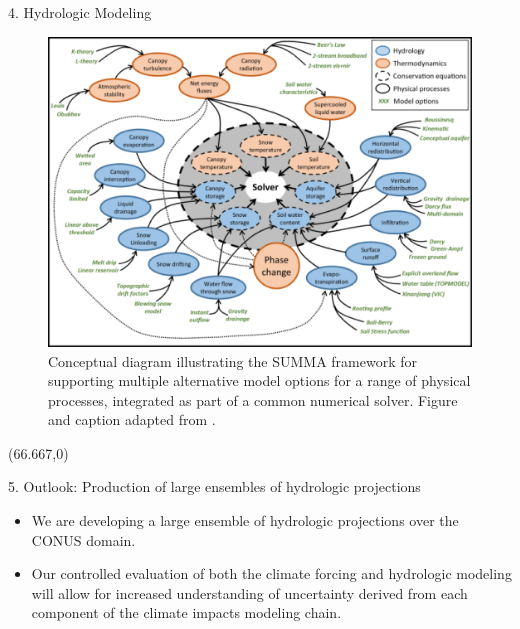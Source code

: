 \documentclass{beamer}
\begin{document}
\begin{frame}{}
\begin{columns}
\begin{column}{.3333\paperwidth}
\begin{textblock}{\textwidth \TPHorizModule}
\begin{block}{4. Hydrologic Modeling}
     \begin{figure}
      \center\includegraphics[width=0.6\linewidth]{figures/summa.png}
      \caption{Conceptual diagram illustrating the SUMMA framework for supporting multiple alternative model options for a range of physical processes, integrated as part of a common numerical solver. Figure and caption adapted from \citet{Clark_2015}.}
      \label{fig:summa}
     \end{figure}

    \end{block}
   \end{textblock}



   \begin{textblock}{\textwidth \TPHorizModule}(66.667,0)
    \begin{block}{5. Outlook: Production of large ensembles of hydrologic projections}

     \begin{itemize}
      \justifying
      \item We are developing a large ensemble of hydrologic projections over the CONUS domain.
      \item Our controlled evaluation of both the climate forcing and hydrologic modeling will allow for increased understanding of uncertainty derived from each component of the climate impacts modeling chain.
     \end{itemize}


\end{block}
\end{textblock}
\end{column}
\end{columns}
\end{frame}
\end{document}
